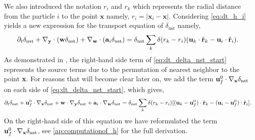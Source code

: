 We also introduced the notation $r_i$ and $r_k$ which represents the radial distance from the particle $i$ to the point $\textbf{x}$ namely, $r_i = |\textbf{x}_i - \textbf{x}|$.  
Considering \ref{eq:dt_h_i}  yields a new expression for the transport equation of $\delta_\text{nst}$ namely,
\begin{equation}
    \pddt \delta_\text{nst}
    + \pddy \cdot (\textbf{w} \delta_\text{nst})
    + \pddw \cdot (\textbf{a}_i  \delta_\text{nst})
    = 
    \delta_\text{nst}
    \sum_k 
    \delta(r_k - r_i)
    (\textbf{u}_k  \cdot \hat{\textbf{r}}_k - \textbf{u}_i  \cdot \hat{\textbf{r}}_i). 
    \label{eq:dt_delta_nst_start}
\end{equation}
As demonstrated in \citet{zhang2023evolution}, the right-hand side term of \ref{eq:dt_delta_nst_start} represents the source terms due to the permutation of nearest neighbor to the point \textbf{x}. 
For reasons that will become clear later on, we add the term $\textbf{u}_f^0\cdot {\mathbf{\nabla}_\textbf{x}} \delta_\text{nst}$ on each side of \ref{eq:dt_delta_nst_start}, which gives,
\begin{equation}
    \pddt \delta_\text{nst}
    + \textbf{u}_f^0\cdot \pddx \delta_\text{nst}
    + \textbf{w}   \cdot \pddy \delta_\text{nst}
    + \textbf{a}_i \cdot \pddw   \delta_\text{nst}
    = 
    \delta_\text{nst}
    \sum_k 
    \delta(r_k - r_i)
    [(\textbf{u}_k - \textbf{u}_f^0) \cdot \hat{\textbf{r}}_k - (\textbf{u}_i  - \textbf{u}_f^0)\cdot \hat{\textbf{r}}_i]. 
    \label{eq:dt_delta_nst}
\end{equation}
On the right-hand side of this equation we have reformulated the term $\textbf{u}_f^0\cdot {\mathbf{\nabla}_\textbf{x}} \delta_\text{nst}$, see \ref{ap:computationof_h} for the full derivation. 

